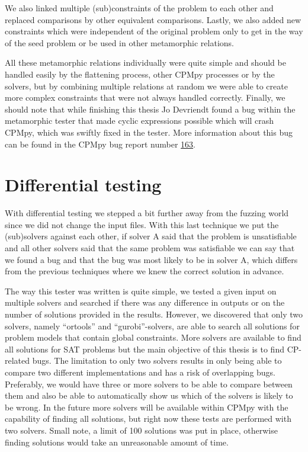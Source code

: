 We also linked multiple (sub)constraints of the problem to each other and replaced comparisons by other equivalent comparisons. Lastly, we also added new constraints which were independent of the original problem only to get in the way of the seed problem or be used in other metamorphic relations.

All these metamorphic relations individually were quite simple and should be handled easily by the flattening process, other CPMpy processes or by the solvers, but by combining multiple relations at random we were able to create more complex constraints that were not always handled correctly. Finally, we should note that while finishing this thesis Jo Devriendt found a bug within the metamorphic tester that made cyclic expressions possible which will crash CPMpy, which was swiftly fixed in the tester. More information about this bug can be found in the CPMpy bug report number \href{https://github.com/CPMpy/cpmpy/issues/163}{163}.

\section{Differential testing}
\label{impl:diff}
With differential testing we stepped a bit further away from the fuzzing world since we did not change the input files.
With this last technique we put the (sub)solvers against each other, if solver A said that the problem is unsatisfiable and all other solvers said that the same problem was satisfiable we can say that we found a bug and that the bug was most likely to be in solver A, which differs from the previous techniques where we knew the correct solution in advance.


The way this tester was written is quite simple, we tested a given input on multiple solvers and searched if there was any difference in outputs or on the number of solutions provided in the results.
However, we discovered that only two solvers, namely “ortools” and “gurobi”-solvers, are able to search all solutions for problem models that contain global constraints. More solvers are available to find all solutions for SAT problems but 
the main objective of this thesis is to find CP-related bugs. The limitation to only two solvers results in only being able to compare two different implementations and has a risk of overlapping bugs. Preferably, we would have three or more solvers to be able to compare between them and also be able to automatically show us which of the solvers is likely to be wrong. In the future more solvers will be available within CPMpy with the capability of finding all solutions, but right now these tests are performed with two solvers. Small note, a limit of 100 solutions was put in place, otherwise finding solutions would take an unreasonable amount of time. 

